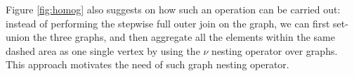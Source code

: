 Figure \ref{fig:homog} also suggests on how such an operation can be carried out: instead of performing the stepwise full outer join on the graph, we can first set-union the three graphs, and then aggregate all the elements within the same dashed area as one single vertex by using the $\nu$ nesting operator over graphs. This approach motivates the need of such graph nesting operator.
